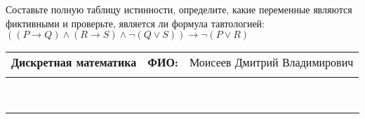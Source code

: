 \documentclass[10pt]{exam}
\newcommand{\class}{Дискретная математика}
\newcommand{\examdate}{}
\begin{document}
\begin{questions}
\begin{enumerate}[a)]
\end{enumerate}\question Составьте полную таблицу истинности, определите, какие переменные являются фиктивными и проверьте, является ли формула тавтологией:
$((P \rightarrow Q) \land (R \rightarrow S) \land \neg (Q \lor S)) \rightarrow \neg (P \lor R)$

\end{questions}
\newpage
\begin{flushright}
\begin{tabular}{p{2.8in} r l}
\textbf{\class} & \textbf{ФИО:} &Моисеев Дмитрий Владимирович
\\

\textbf{\examdate} &&\\
\end{tabular}\\
\end{flushright}
\rule[1ex]{\textwidth}{.1pt}
\end{document}
